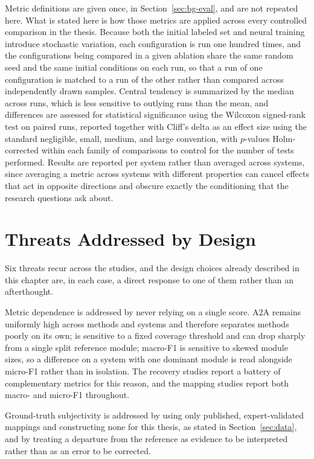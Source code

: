 Metric definitions are given once, in Section~\ref{sec:bg-eval}, and are not repeated here. What is stated here is how those metrics are applied across every controlled comparison in the thesis. Because both the initial labeled set and neural training introduce stochastic variation, each configuration is run one hundred times, and the configurations being compared in a given ablation share the same random seed and the same initial conditions on each run, so that a run of one configuration is matched to a run of the other rather than compared across independently drawn samples. Central tendency is summarized by the median across runs, which is less sensitive to outlying runs than the mean, and differences are assessed for statistical significance using the Wilcoxon signed-rank test on paired runs, reported together with Cliff's delta as an effect size using the standard negligible, small, medium, and large convention, with $p$-values Holm-corrected within each family of comparisons to control for the number of tests performed. Results are reported per system rather than averaged across systems, since averaging a metric across systems with different properties can cancel effects that act in opposite directions and obscure exactly the conditioning that the research questions ask about.

\section{Threats Addressed by Design}
\label{sec:method-threats}

Six threats recur across the studies, and the design choices already described in this chapter are, in each case, a direct response to one of them rather than an afterthought.

Metric dependence is addressed by never relying on a single score. A2A remains uniformly high across methods and systems and therefore separates methods poorly on its own; \cc{} is sensitive to a fixed coverage threshold and can drop sharply from a single split reference module; macro-F1 is sensitive to skewed module sizes, so a difference on a system with one dominant module is read alongside micro-F1 rather than in isolation. The recovery studies report a battery of complementary metrics for this reason, and the mapping studies report both macro- and micro-F1 throughout.

Ground-truth subjectivity is addressed by using only published, expert-validated mappings and constructing none for this thesis, as stated in Section~\ref{sec:data}, and by treating a departure from the reference as evidence to be interpreted rather than as an error to be corrected.

